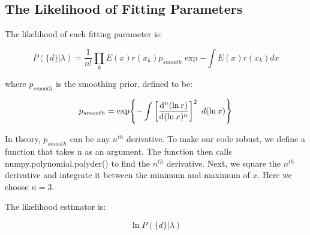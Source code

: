 \subsection{The Likelihood of Fitting Parameters}
\label{subsec:likelihood}

The likelihood of each fitting parameter is:

\begin{equation}
\label{likelihood}
P(\{d\}|\lambda) = \frac{1}{n!}\prod_{k} E(x)r(x_k) p_{smooth}\exp{-\int E(x)r(x_k)dx}
\end{equation}

where $p_{smooth}$ is the smoothing prior, defined to be:

\begin{equation}
\label{smoothing_prior}
p_{smooth} = \exp{-\int \bigg[\dv[n]{(\ln{r})}{(\ln{x})}\bigg]^2 \hspace{5pt} d{(\ln{x})}}
\end{equation}

In theory, $p_{smooth}$ can be any $n^{th}$ derivative. To make our code robust, we define a function that takes n as an argument. The function then calls numpy.polynomial.polyder() to find the $n^{th}$ derivative. Next, we square the $n^{th}$ derivative and integrate it between the minimum and maximum of $x$. Here we choose $n = 3$.

The likelihood estimator is:

\begin{equation}
\label{likelihood_estimator}
\ln{P(\{d\}|\lambda)}
\end{equation}

